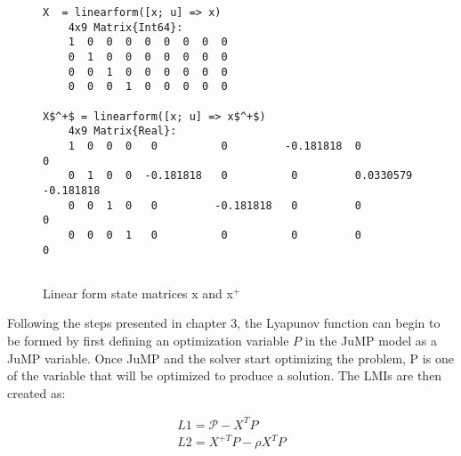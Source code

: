 \begin{figure}[h!]
    \begin{lstlisting}[mathescape]
X  = linearform([x; u] => x)
    4x9 Matrix{Int64}:
    1  0  0  0  0  0  0  0  0
    0  1  0  0  0  0  0  0  0
    0  0  1  0  0  0  0  0  0
    0  0  0  1  0  0  0  0  0

X$^+$ = linearform([x; u] => x$^+$)
    4x9 Matrix{Real}:
    1  0  0  0   0          0         -0.181818  0           0
    0  1  0  0  -0.181818   0          0         0.0330579  -0.181818
    0  0  1  0   0         -0.181818   0         0           0
    0  0  0  1   0          0          0         0           0
    
    \end{lstlisting}
    \caption{Linear form state matrices x and x$^+$}
    \label{ex_linearform_state}
    \end{figure}

Following the steps presented in chapter 3, the Lyapunov function can begin to be formed by first defining an optimization variable $P$ in the JuMP model as a JuMP variable. Once JuMP and the solver start optimizing the problem, P is one of the variable that will be optimized to produce a solution. The LMIs are then created as:

\begin{subequations} \label{eqn:Ly_ineq3}
	\begin{align}
	    L1 = \mathcal{P} - X^TP      \\
        L2 = X^{+T}P - \rho X^TP
	\end{align}
\end{subequations}

